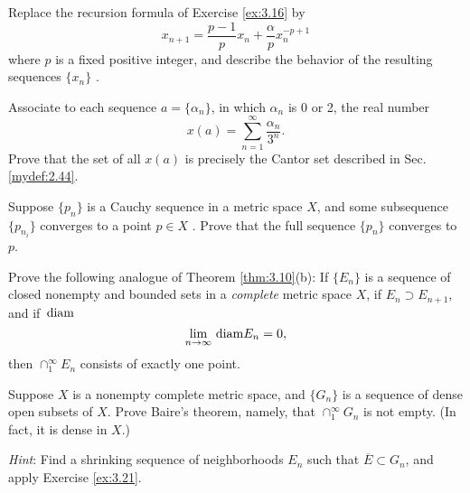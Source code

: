 \begin{myExercise}
    \label{ex:3.18}
    Replace the recursion formula of Exercise \ref{ex:3.16} by 
    \begin{equation*}
        x_{n+1} = \frac{p-1}{p}x_n + \frac{\alpha}{p}x_n^{-p+1}
    \end{equation*}
    where $p$ is a fixed positive integer, and describe the behavior of the resulting sequences $\{x_n\}$ .
\end{myExercise}

\begin{myExercise}
    \label{ex:3.19}
    Associate to each sequence $a = \{\alpha_n\}$, 
    in which $\alpha_n$ is 0 or 2,
    the real number 
    \begin{equation*}
        x(a) = \sum_{n=1}^{\infty} \frac{\alpha_n}{3^n} .
    \end{equation*}
    Prove that the set of all $x(a)$ is precisely the Cantor set described in Sec. \ref{mydef:2.44}.
\end{myExercise}


\begin{myExercise}
    \label{ex:3.20}
    Suppose $\{p_n\}$ is a Cauchy sequence in a metric space $X$,
    and some subsequence $\{p_{n_i}\}$ converges to a point $p \in X$ .
    Prove that the full sequence $\{p_n\}$ converges to $p$.
\end{myExercise}


\begin{myExercise}
    \label{ex:3.21}
    Prove the following analogue of Theorem \ref{thm:3.10}(b): 
    If $\{E_n\}$ is a sequence of closed nonempty and bounded sets in a \emph{complete} metric space $X$, 
    if $E_n \supset E_{n+1}$, and if $\protect\mathop{}\mathrm{diam}$
    \begin{equation*}
        \lim_{n \to \infty} \protect\mathop{}\mathrm{diam} E_n = 0 ,
    \end{equation*}
    then $\cap_1^{\infty} E_n$ consists of exactly one point.
\end{myExercise}


\begin{myExercise}
    \label{ex:3.22}
    Suppose $X$ is a nonempty complete metric space, 
    and $\{G_n\}$ is a sequence of dense open subsets of $X$. 
    Prove Baire's theorem, namely, that $\cap_1^{\infty} G_n$ is not
    empty. 
    (In fact, it is dense in $X$.) 
    
    \emph{Hint}: Find a shrinking sequence of neighborhoods $E_n$ such that 
    $\overline{E} \subset G_n$, and apply Exercise \ref{ex:3.21}.
\end{myExercise}


